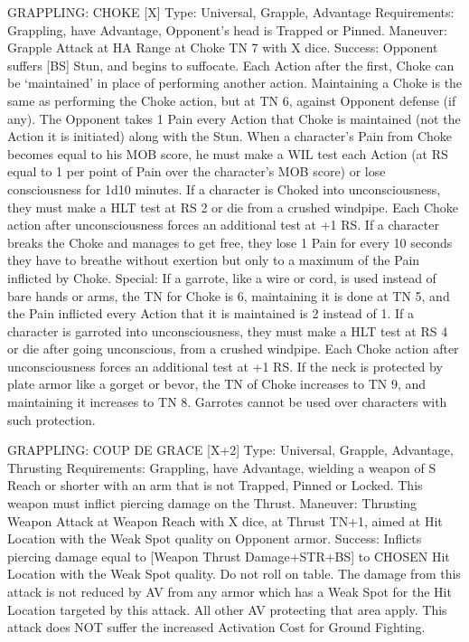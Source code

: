 \documentclass[oneside,11pt,english]{book}
\begin{document}
GRAPPLING: CHOKE [X] 
Type: Universal, Grapple, Advantage 
Requirements: Grappling, have Advantage, Opponent's head is Trapped or Pinned. 
Maneuver: Grapple Attack at HA Range at Choke TN 7 with X dice. 
Success: Opponent suffers [BS] Stun, and begins to suffocate. 
Each Action after the first, Choke can be ‘maintained’ in place of performing another action. Maintaining 
a Choke is the same as performing the Choke action, but at TN 6, against Opponent defense (if any). The 
Opponent takes 1 Pain every Action that Choke is maintained (not the Action it is initiated) along with 
the Stun. 
When a character's Pain from Choke becomes equal to his MOB score, he must make a WIL test each 
Action (at RS equal to 1 per point of Pain over the character's MOB score) or lose consciousness for 1d10 
minutes. If a character is Choked into unconsciousness, they must make a HLT test at RS 2 or die from a 
crushed windpipe. Each Choke action after unconsciousness forces an additional test at +1 RS. 
If a character breaks the Choke and manages to get free, they lose 1 Pain for every 10 seconds they have 
to breathe without exertion but only to a maximum of the Pain inflicted by Choke. 
Special: If a garrote, like a wire or cord, is used instead of bare hands or arms, the TN for Choke is 6, 
maintaining it is done at TN 5, and the Pain inflicted every Action that it is maintained is 2 instead of 1. If 
a character is garroted into unconsciousness, they must make a HLT test at RS 4 or die after going 
unconscious, from a crushed windpipe. Each Choke action after unconsciousness forces an additional test 
at +1 RS. 
If the neck is protected by plate armor like a gorget or bevor, the TN of Choke increases to TN 9, and 
maintaining it increases to TN 8. Garrotes cannot be used over characters with such protection. 

 

GRAPPLING: COUP DE GRACE [X+2] 
Type: Universal, Grapple, Advantage, Thrusting 
Requirements: Grappling, have Advantage, wielding a weapon of S Reach or shorter with an arm that is 
not Trapped, Pinned or Locked. This weapon must inflict piercing damage on the Thrust. 
Maneuver: Thrusting Weapon Attack at Weapon Reach with X dice, at Thrust TN+1, aimed at Hit 
Location with the Weak Spot quality on Opponent armor. 
Success: Inflicts piercing damage equal to [Weapon Thrust Damage+STR+BS] to CHOSEN Hit Location 
with the Weak Spot quality. Do not roll on table. The damage from this attack is not reduced by AV from 
any armor which has a Weak Spot for the Hit Location targeted by this attack. All other AV protecting 
that area apply. 
This attack does NOT suffer the increased Activation Cost for Ground Fighting. 
\end{document}
